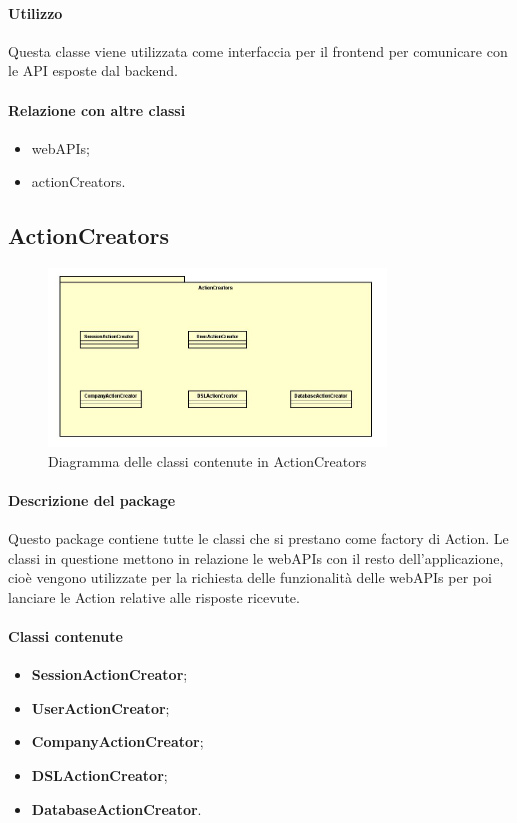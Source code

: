 \paragraph*{Utilizzo}
Questa classe viene utilizzata come interfaccia per il frontend per comunicare con le API esposte dal backend.
\paragraph*{Relazione con altre classi}
\begin{itemize}
\item webAPIs;
\item actionCreators.
\end{itemize} 

\subsection{ActionCreators}

\begin{figure}[h]
\centering
\includegraphics[width=0.8\textwidth]{res/sections/imgs/actioncreator-diagram.jpg}
\caption{Diagramma delle classi contenute in ActionCreators}
\end{figure}

\paragraph*{Descrizione del package}
Questo package contiene tutte le classi che si prestano come factory di Action. Le classi in questione mettono in relazione le webAPIs con il resto dell'applicazione, cioè vengono utilizzate per la richiesta delle funzionalità delle webAPIs per poi lanciare le Action relative alle risposte ricevute.

\paragraph*{Classi contenute}
\begin{itemize}
\item \textbf{SessionActionCreator};
\item \textbf{UserActionCreator};
\item \textbf{CompanyActionCreator};
\item \textbf{DSLActionCreator};
\item \textbf{DatabaseActionCreator}.
\end{itemize}

